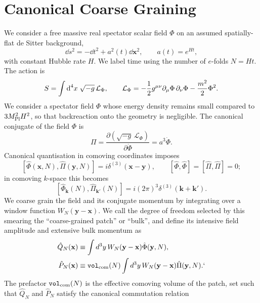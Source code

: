 \documentclass{article}
\def\exd{{\hbox{d}}}
\newcommand{\VF}{\mathtt{vol}_{\rm com}}
\newcommand{\hvarphi}{\hat{\Phi}}
\newcommand{\hpi}{\hat{\Pi}}
\numberwithin{equation}{section}
\begin{document}
	\section{Canonical Coarse Graining}
	\label{sec:coarsegraining_hamiltonian}
	We consider a free massive real spectator scalar field $\Phi$ on an assumed spatially-flat de Sitter background,
	\begin{equation}\label{eq:frw-metric}
		\dd s^{2}=-\dd t^{2}+a^{2}(t)\dd \bm{x}^{2}, \qquad a(t)=e^{Ht},
	\end{equation}
	with constant Hubble rate $H$. We label time using the number of \(e\)-folds \(N = H t\). The action is
	\begin{equation}\label{eq:action}
		S=\int \exd^{4}x\; \sqrt{-g}\, \mathcal{L}_{\Phi}, \qquad \mathcal L_\Phi = -\frac12 g^{\mu\nu}\partial_\mu\Phi\,\partial_\nu\Phi -\frac{m^2}{2}\Phi^2 .
	\end{equation}
    We consider a spectator field \(\Phi\) whose energy density remains small compared to
	\( 3M_{\rm Pl}^2H^2\), so that	backreaction onto the geometry is negligible. The canonical conjugate of the field $\Phi$ is
	\begin{equation}\label{eq:pivarphi}
		\Pi = \frac{\partial(\sqrt{-g}\,\mathcal L_\Phi)} {\partial \dot\Phi} = a^3\dot\Phi .
	\end{equation}
	Canonical quantisation in comoving coordinates imposes
	\begin{equation}\label{eq:ETCR}
		[\hvarphi(\bm x, N),\hpi(\bm y,N)] = i\delta^{(3)}(\bm x-\bm y), \qquad [\hvarphi,\hvarphi]=[\hpi,\hpi]=0 ;
	\end{equation}
	in comoving $k$-space this becomes
	\begin{equation}\label{eq:ETCRk}
		[\hvarphi_{\bm k}(N),\hpi_{\bm k'}(N)] = i(2\pi)^3\delta^{(3)}(\bm k+\bm k') .
	\end{equation}
	We coarse grain the field and its conjugate momentum by integrating over a window function $W_N(\bm{y}-\bm{x})$. We call the degree of freedom selected by	this smearing the ``coarse-grained patch'' or ``bulk'', and define its intensive field amplitude and extensive bulk momentum as
	\begin{align} \label{eq:cg:fields:def}
    \hat Q_N(\mathbf x)
    &\equiv \int d^3y\,W_N(\mathbf y-\mathbf x)\hat\Phi(\mathbf y, N),
    \\
    \hat P_N(\mathbf x)
    &\equiv \VF(N)\int d^3y\,W_N(\mathbf y-\mathbf x)\hat\Pi(\mathbf y, N).
`   \end{align}
	The prefactor $\VF(N)$ is the effective comoving volume of the patch, set such that $\hat Q_N$ and $\hat P_N$ satisfy the canonical commutation relation
\end{document}
